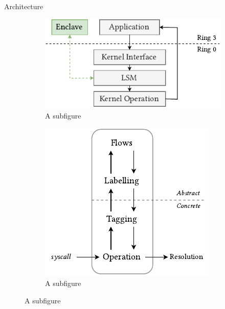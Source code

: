 \documentclass[xcolor=dvipsnames]{beamer}
\begin{document}
\begin{frame}{Architecture}

    \begin{figure}
        \centering
        \begin{subfigure}{.5\textwidth}
          \centering
          \includegraphics[width=.9\linewidth]{../figures/SGX-EnclaveIntegration.pdf}
          \vspace{5mm}
          \caption{A subfigure}
          \label{fig:sub1}
        \end{subfigure}%
        \begin{subfigure}{.5\textwidth}
          \centering
          \includegraphics[width=.85\linewidth]{../figures/IFCFlow-1.pdf}
          \vspace{5mm}
          \caption{A subfigure}
          \label{fig:sub2}
        \end{subfigure}
        \label{fig:test}
    \end{figure}

    
\end{frame}
\end{document}
